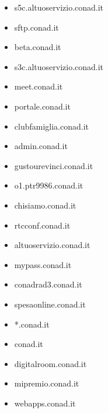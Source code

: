 \documentclass{article}
\begin{document}
\begin{itemize}
            \item s5c.altuoservizio.conad.it
        
            \item sftp.conad.it
        
            \item beta.conad.it
        
            \item s3c.altuoservizio.conad.it
        
            \item meet.conad.it
        
            \item portale.conad.it
        
            \item clubfamiglia.conad.it
        
            \item admin.conad.it
        
            \item gustourevinci.conad.it
        
            \item o1.ptr9986.conad.it
        
            \item chisiamo.conad.it
        
            \item rtcconf.conad.it
        
            \item altuoservizio.conad.it
        
            \item mypass.conad.it
        
            \item conadrad3.conad.it
        
            \item spesaonline.conad.it
        
            \item *.conad.it
        
            \item conad.it
        
            \item digitalroom.conad.it
        
            \item mipremio.conad.it
        
            \item webapps.conad.it
        

\end{itemize}
\end{document}
